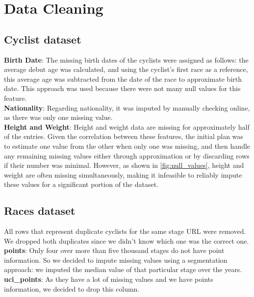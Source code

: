 \section{Data Cleaning}
\label{sec: data_cleaning}

\subsection{Cyclist dataset}

\textbf{Birth Date}:
The missing birth dates of the cyclists were assigned as follows: the average debut age was calculated, and using the cyclist's first race as a reference, this average age was subtracted from the date of the race to approximate birth date. This approach was used because there were not many null values for this feature.\\

\noindent
\textbf{Nationality}:
Regarding nationality, it was imputed by manually checking online, as there was only one missing value. \\

\noindent
\textbf{Height and Weight}:
Height and weight data are missing for approximately half of the entries. Given the correlation between these features, the initial plan was to estimate one value from the other when only one was missing, and then handle any remaining missing values either through approximation or by discarding rows if their number was minimal. However, as shown in \autoref{fig:null_values}, height and weight are often missing simultaneously, making it infeasible to reliably impute these values for a significant portion of the dataset.

\subsection{Races dataset}
All rows that represent duplicate cyclists for the same stage URL were removed. We dropped both duplicates since we didn’t know which one was the correct one.\\

\noindent
\textbf{points}:
Only four over more than five thousand stages do not have point information. So we decided to impute missing values using a segmentation approach: we imputed the median value of that particular stage over the years. \\

\noindent
\textbf{uci\_points}:
As they have a lot of missing values and we have points information, we decided to drop this column.\\

